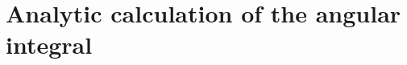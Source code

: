 \documentclass[10pt,a4paper,a4wide]{article}
\newcommand{\be}{\begin{equation}}
\newcommand{\ee}{\end{equation}}
\newcommand{\bea}{\begin{eqnarray}}
\newcommand{\eea}{\end{eqnarray}}
\newcommand{\ii}{\mathrm{i}}
\newcommand{\dd}{\mathrm{d}}
\newcommand{\bb}[1]{\left( #1 \right)}
\newcommand{\bbcro}[1]{\left[ #1 \right]}
\begin{document}


\section{Analytic calculation of the angular integral}
\end{document}
